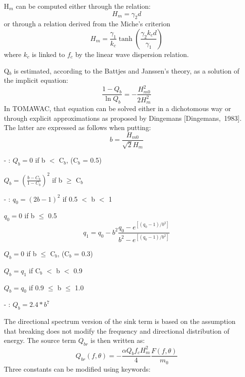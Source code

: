 H${}_{m}$ can be computed either through the relation:
\begin{equation} \label{GrindEQ__4_45_}
H_{m} =\gamma _{2} d
\end{equation}
or through a relation derived from the Miche's criterion
\begin{equation} \label{GrindEQ__4_46_}
H_{m} =\frac{\gamma _{1} }{k_{c} } \tanh \left(\frac{\gamma _{2} k_{c} d}{\gamma _{1} } \right)
\end{equation}
where $k_{c} $ is linked to $f_{c} $ by the linear wave dispersion relation.

 Q${}_{b}$ is estimated, according to the Battjes and Janssen's theory, as a solution of the implicit equation:
\begin{equation} \label{GrindEQ__4_47_}
\frac{1-Q_{b} }{\ln Q_{b} } =-\frac{H_{m0}^{2} }{2H_{m}^{2} }
\end{equation}
In TOMAWAC, that equation can be solved either in a dichotomous way or through explicit approximations as proposed by Dingemans [Dingemans,~1983]. The latter are expressed as follows when putting:
\[b=\frac{H_{m0} }{\sqrt{2} H_{m} } \]

 - :  $Q_{b} =0$   if b $<$ C${}_{b}$, (C${}_{b}$ = 0.5)

 $Q_{b} =\left(\frac{b-C_{b} }{1-C_{b} } \right)^{2} $ if b $\geq$ C${}_{b}$

 - :  $q_{0} =\left(2b-1\right)^{2} $ if 0.5 $<$ b $<$ 1

 $q_{0} =0$ if b $\leq$ 0.5
\[q_{1} =q_{0} -b^{2} \frac{q_{0} -e^{\left[\left(q_{0} -1\right)/b^{2} \right]} }{b^{2} -e^{\left[\left(q_{0} -1\right)/b^{2} \right]} } \]

    $Q_{b} =0$   if b $\leq$ C${}_{b}$, (C${}_{b}$ = 0.3)

 $Q_{b} =q_{1} $  if C${}_{b}$ $<$ b $<$ 0.9

 $Q_{b} =q_{0} $  if 0.9 $\leq$ b $\leq$ 1.0

 - :  $Q_{b} =2.4*b^{7} $

 The directional spectrum version of the sink term is based on the assumption that breaking does not modify the frequency and directional distribution of energy. The source term $Q_{br} $ is then written as:
\begin{equation} \label{GrindEQ__4_48_}
Q_{br} \left(f,\theta \right)=-\frac{\alpha Q_{b} f_{c} H_{m}^{2} }{4} \frac{F\left(f,\theta \right)}{m_{0} }
\end{equation}
Three constants can be modified using keywords:

